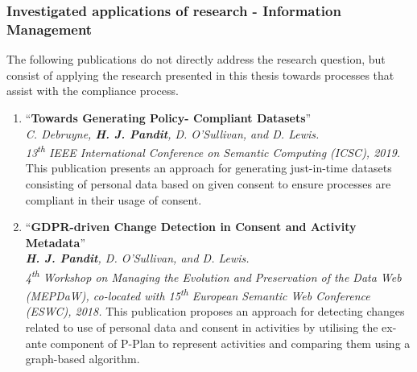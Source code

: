 \subsubsection{Investigated applications of research - Information Management}
The following publications do not directly address the research question, but consist of applying the research presented in this thesis towards processes that assist with the compliance process.
\begin{enumerate}[resume]
    \item ``\textbf{Towards Generating Policy- Compliant Datasets}'' \cite{debruyne_towards_2019} \\
    \textit{C. Debruyne, \textbf{H. J. Pandit}, D. O’Sullivan, and D. Lewis.} \\ 
    \textit{13\textsuperscript{th} IEEE International Conference on Semantic Computing (ICSC), 2019.}
    \vspace{0.1cm} \newline This publication presents an approach for generating just-in-time datasets consisting of personal data based on given consent to ensure processes are compliant in their usage of consent.
    \item ``\textbf{GDPR-driven Change Detection in Consent and Activity Metadata}'' \cite{pandit_gdpr-driven_2018} \\
    \textit{\textbf{H. J. Pandit}, D. O’Sullivan, and D. Lewis.} \\ 
    \textit{4\textsuperscript{th} Workshop on Managing the Evolution and Preservation of the Data Web (MEPDaW), co-located with 15\textsuperscript{th} European Semantic Web Conference (ESWC), 2018.}
    \vspace{0.1cm} \newline This publication proposes an approach for detecting changes related to use of personal data and consent in activities by utilising the ex-ante component of P-Plan to represent activities and comparing them using a graph-based algorithm.
\end{enumerate}

